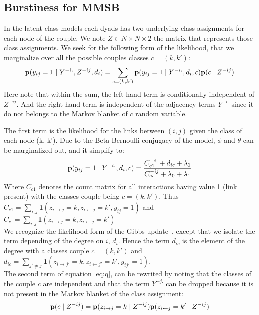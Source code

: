 \subsection{Burstiness for MMSB}

\label{burst_class}

In the latent class models each  dyads has two underlying  class assignments for each node of the couple. We note $Z \in N\times N\times 2$ the matrix that represents those class assignments.
We seek for the following form of the likelihood, that we marginalize over all the possible couples classes $c=(k, k')$:
\begin{equation} \label{eq:q}
\pr(y_{ij}=1 \mid Y^{-i\bm{.}}, Z^{-ij}, d_i ) = \sum_{c=(k, k')} \pr(y_{ij}=1 \mid Y^{-i\bm{.}}, d_i , c) \pr(c \mid  Z^{-ij} ) 
\end{equation}
Here note that within the sum, the left hand term is conditionally independent of $Z^{-ij}$. And the right hand term is independent of the adjacency terms $Y^{-i\bm{.}}$ since it do not belongs to the Markov blanket of $c$ random variable.

The first term is the likelihood for the links between $(i,j)$ given the class of each node (k, k'). Due to the Beta-Bernoulli conjugacy of the model, $\phi$ and $\theta$ can be marginalized out, and it simplify to: 
\begin{equation} \label{eq:qc}
\pr(y_{ij}=1 \mid Y^{-i\bm{.}}, d_i , c) = \frac{C_{c1}^{-i.} + d_{ic} + \lambda_1}{C_{c\bm{.}}^{-ij} + \lambda_0+\lambda_1} 
\end{equation}
Where $C_{c1}$ denotes the count matrix for all interactions having value 1 (link present) with the classes couple being $c=(k, k')$. Thus $C_{c1} = \sum_{i,j} \bm{1}(z_{i\rightarrow j}=k, z_{i\leftarrow j}=k', y_{ij}=1)$ and $C_{c.} = \sum_{i,j} \bm{1}(z_{i\rightarrow j}=k, z_{i\leftarrow j}=k')$\\

We recognize the likelihood form of the Gibbs update~\cite{HDP}, except that we isolate the term depending of the degree on $i$, $d_i$. Hence the term $d_{ic}$ is the element of the degree with a classes couple $c=(k,k')$ and $d_{ic} = \sum_{j' \neq j} \bm{1}(z_{i\rightarrow j'}=k, z_{i\leftarrow j'}=k', y_{ij'}=1) $.\\

The second term of equation \eqref{eq:q}, can be rewrited by noting that the classes of the couple $c$ are independent and that the term $Y^{-j\bm{.}}$ can be dropped because it is not present in the Markov blanket of the class assignment: 
\begin{equation} \label{eq:topic_assign}
\pr(c \mid  Z^{-ij} ) =  \pr(z_{i\rightarrow j}=k \mid Z^{-ij}) \pr(z_{i\leftarrow j}=k' \mid Z^{-ij})
\end{equation}

